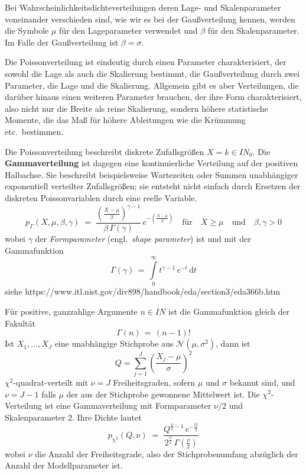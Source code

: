 Bei Wahrscheinlichkeitsdichteverteilungen deren Lage- und Skalenparameter
voneinander verschieden sind, wie wir es bei der Gaußverteilung kennen, werden die
Symbole $\mu$ für den Lageparameter verwendet und $\beta$ für den Skalenparameter.
Im Falle der Gaußverteilung ist $\beta = \sigma$.

Die Poissonverteilung ist eindeutig durch einen Parameter charakterisiert, der sowohl
die Lage als auch die Skalierung bestimmt, die Gaußverteilung durch zwei Parameter, die
Lage und die Skalierung. Allgemein gibt es aber Verteilungen, die darüber hinaus einen
weiteren Parameter brauchen, der ihre Form charakterisiert, also nicht nur die Breite als
reine Skalierung, sondern höhere statistische Momente, die das Maß für höhere Ableitungen
wie die Krümmung etc.\ bestimmen.

Die Poissonverteilung beschreibt diskrete Zufallsgrößen $X = k \in I \!\! N_0$.
Die \textbf{Gammaverteilung} ist dagegen eine kontinuierliche Verteilung auf der positiven
Halbachse. Sie beschreibt beispielsweise Wartezeiten oder Summen unabhängiger
exponentiell verteilter Zufallsgrößen; sie entsteht nicht einfach durch Ersetzen der
diskreten Poissonvariablen durch eine reelle Variable.
\begin{equation}
p_\Gamma(X, \mu, \beta, \gamma) \; = \; \frac{\left(\frac{X - \mu}{\beta}\right)^{\gamma-1}}{\beta \, \Gamma(\gamma)}
 \, e^{-\left(\frac{X - \mu}{\beta}\right)}
 \quad \text{f\"ur} \quad X \geq \mu \quad \text{und} \quad \beta, \gamma > 0
\label{Gammaverteilung}
\end{equation}
wobei $\gamma$ der \textsl{Formparameter} (engl.\ \textsl{shape parameter}) ist und mit der Gammafunktion
$$
\Gamma(\gamma) \, = \, \int\limits_{0}^{\infty} t^{\gamma - 1} \, e^{-t} \, \mathrm{d}t
$$
siehe https://www.itl.nist.gov/div898/handbook/eda/section3/eda366b.htm

Für positive, ganzzahlige Argumente $n \in I \!\! N$ ist die Gammafunktion gleich der Fakultät
$$
\Gamma(n) \, = \, (n - 1)!
$$
Ist $X_1,\ldots,X_J$ eine unabhängige Stichprobe aus $\mathcal{N}(\mu,\sigma^2)$,
dann ist
$$
Q=\sum_{j=1}^{J}\left(\frac{X_j-\mu}{\sigma}\right)^2
$$
$\chi^2$-quadrat-verteilt mit $\nu = J$ Freiheitsgraden, sofern $\mu$ und $\sigma$ bekannt sind, und
$\nu = J-1$ falls $\mu$ der aus der Stichprobe gewonnene Mittelwert ist. Die $\chi^2$-Verteilung ist eine
Gammaverteilung mit Formparameter $\nu/2$ und Skalenparameter $2$. Ihre Dichte lautet
\begin{equation}
p_\mathrm{\chi^2}(Q, \nu) \; = \;
\frac{Q^{\frac{\nu}{2} - 1} \,
  e^{-\frac{Q}{2}}}{2^{\frac{\nu}{2}} \, \Gamma(\frac{\nu}{2})}
\label{Chi2pdf}
\end{equation}
wobei $\nu$ die Anzahl der Freiheitsgrade, also der Stichprobenumfang abzüglich der Anzahl der
Modellparameter ist.


